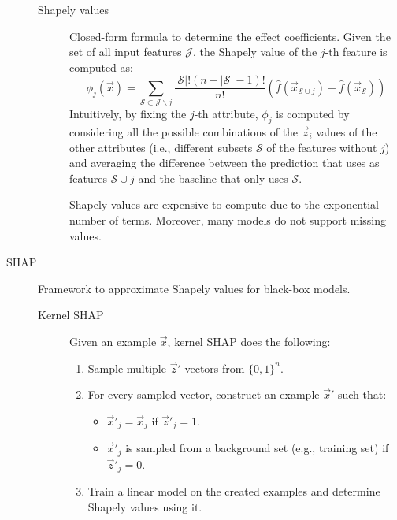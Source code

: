 \begin{description}
        \begin{description}
            \item[Shapely values] 
                Closed-form formula to determine the effect coefficients. Given the set of all input features $\mathcal{J}$, the Shapely value of the $j$-th feature is computed as:
                \[ \phi_j(\vec{x}) = \sum_{\mathcal{S} \subset \mathcal{J} \smallsetminus j} \frac{|\mathcal{S}|! (n - |\mathcal{S}| - 1)!}{n!} (\hat{f}(\vec{x}_{\mathcal{S} \cup j}) - \hat{f}(\vec{x}_{\mathcal{S}})) \]
                Intuitively, by fixing the $j$-th attribute, $\phi_j$ is computed by considering all the possible combinations of the $\vec{z}_i$ values of the other attributes (i.e., different subsets $\mathcal{S}$ of the features without $j$) and averaging the difference between the prediction that uses as features $\mathcal{S} \cup j$ and the baseline that only uses $\mathcal{S}$.

                \begin{remark}
                    Shapely values are expensive to compute due to the exponential number of terms. Moreover, many models do not support missing values.
                \end{remark}
        \end{description}

    \item[SHAP] 
        Framework to approximate Shapely values for black-box models.

        \begin{description}
            \item[Kernel SHAP] 
                Given an example $\vec{x}$, kernel SHAP does the following:
                \begin{enumerate}
                    \item Sample multiple $\vec{z}'$ vectors from $\{ 0, 1 \}^n$.
                    \item For every sampled vector, construct an example $\vec{x}'$ such that:
                    \begin{itemize}
                        \item $\vec{x}'_j = \vec{x}_j$ if $\vec{z}'_j = 1$.
                        \item $\vec{x}'_j$ is sampled from a background set (e.g., training set) if $\vec{z}'_j = 0$.
                    \end{itemize}
                    \item Train a linear model on the created examples and determine Shapely values using it.
                \end{enumerate}


\end{description}
\end{description}
